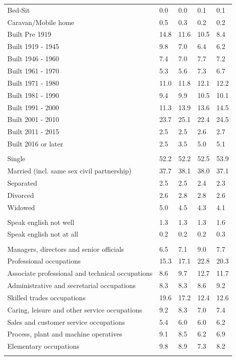 \documentclass{article}
\begin{document}
\begin{table}[h]
\begin{tabular}{KTTTT}
Bed-Sit & 0.0& 0.0& 0.1& 0.1\\
Caravan/Mobile home & 0.5& 0.3& 0.2& 0.2\\
    \hline
Built Pre 1919 & 14.8& 11.6& 10.5&  8.4\\
Built 1919 - 1945 & 9.8& 7.0& 6.4& 6.2\\
Built  1946 - 1960 & 7.4& 7.0& 7.7& 7.2\\
Built  1961 - 1970 & 5.3& 5.6& 7.3& 6.7\\
Built  1971 - 1980 & 11.0& 11.8& 12.1& 12.2\\
Built  1981 - 1990 &  9.4&  9.9& 10.5& 10.1\\
Built  1991 - 2000 & 11.3& 13.9& 13.6& 14.5\\
Built  2001 - 2010 & 23.7& 25.1& 22.4& 24.5\\
Built  2011 - 2015 & 2.5& 2.5& 2.6& 2.7\\
Built  2016 or later & 2.5& 3.5& 5.0& 5.1\\
\hline
    \\
    \hline
Single & 52.2& 52.2& 52.5& 53.9\\
Married (incl. same sex civil partnership) & 37.7& 38.1& 38.0& 37.1\\
Separated  & 2.5& 2.5& 2.4& 2.3\\
Divorced  & 2.6& 2.8& 2.8& 2.6\\
Widowed & 5.0& 4.5& 4.3& 4.1\\
\hline
    \\ 
    \hline
Speak english not well & 1.3& 1.3& 1.3& 1.6\\
Speak english not at all & 0.2& 0.2& 0.2& 0.3\\
\hline
    \\
    \hline
Managers, directors and senior officials & 6.5& 7.1& 9.0& 7.7\\
Professional occupations & 15.3& 17.1& 22.8& 20.3\\
Associate professional and technical occupations &  8.6&  9.7& 12.7& 11.7\\
Administrative and secretarial occupations & 8.3& 8.3& 8.6& 9.2\\
Skilled trades occupations & 19.6& 17.2& 12.4& 12.6\\
Caring, leisure and other service occupations & 9.2& 8.3& 7.0& 7.4\\
Sales and customer service occupations & 5.4& 6.0& 6.0& 6.2\\
Process, plant and machine operatives & 9.1& 8.5& 6.2& 6.9\\
Elementary occupations & 9.8& 8.9& 7.3& 8.2\\
\hline
\end{tabular}
\end{table}
\end{document}
